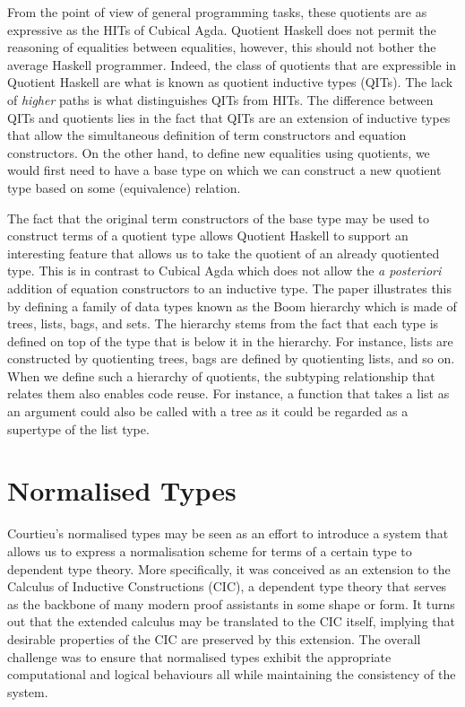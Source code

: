 \documentclass[12pt,twoside,maitrise]{dms}
\theoremstyle{definition}
\numberwithin{equation}{section}
\numberwithin{table}{chapter}
\numberwithin{figure}{chapter}
\newcommand\latinphrase{\textit}
\begin{document}
From the point of view of general programming tasks, these quotients are as
expressive as the HITs of Cubical Agda. Quotient Haskell does not permit the
reasoning of equalities between equalities, however, this should not bother the
average Haskell programmer. Indeed, the class of quotients that are expressible
in Quotient Haskell are what is known as quotient inductive types
(QITs)\cite{fiore2022quotients, HoTTbook}. The lack of \emph{higher} paths is
what distinguishes QITs from HITs. The difference between QITs and quotients
lies in the fact that QITs are an extension of inductive types that allow the
simultaneous definition of term constructors and equation constructors. On the
other hand, to define new equalities using quotients, we would first need to
have a base type on which we can construct a new quotient type based on some
(equivalence) relation.

The fact that the original term constructors of the base type may be used to
construct terms of a quotient type allows Quotient Haskell to support an
interesting feature that allows us to take the quotient of an already quotiented
type. This is in contrast to Cubical Agda which does not allow the
\latinphrase{a posteriori} addition of equation constructors to an inductive
type. The paper illustrates this by defining a family of data types known as the
Boom hierarchy\cite{meertens1986algorithmics} which is made of trees, lists,
bags, and sets. The hierarchy stems from the fact that each type is defined on
top of the type that is below it in the hierarchy. For instance, lists are
constructed by quotienting trees, bags are defined by quotienting lists, and so
on. When we define such a hierarchy of quotients, the subtyping relationship
that relates them also enables code reuse. For instance, a function that takes a
list as an argument could also be called with a tree as it could be regarded as
a supertype of the list type.

\section{Normalised Types}\label{sec:normalised-types-courtieu}

Courtieu's normalised types\cite{courtieu-normalizedtypes} may be seen as an
effort to introduce a system that allows us to express a normalisation scheme
for terms of a certain type to dependent type theory. More specifically,
it was conceived as an extension to the Calculus of Inductive Constructions
(CIC)\cite{werner-cic}, a dependent type theory that serves as the backbone of
many modern proof assistants in some shape or form. It turns out that the
extended calculus may be translated to the CIC itself, implying that desirable
properties of the CIC are preserved by this extension. The overall challenge was
to ensure that normalised types exhibit the appropriate computational and
logical behaviours all while maintaining the consistency of the system.
\end{document}
